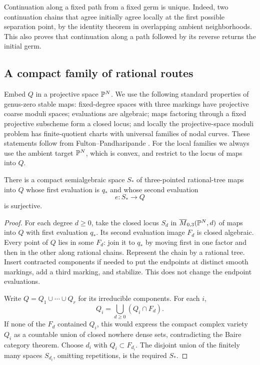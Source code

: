 Continuation along a fixed path from a fixed germ is unique. Indeed,
two continuation chains that agree initially agree locally at the first
possible separation point, by the identity theorem in overlapping
ambient neighborhoods. This also proves that continuation along a path
followed by its reverse returns the initial germ.

\subsection{A compact family of rational routes}

Embed \(Q\) in a projective space \(\mathbb P^N\). We use the following standard
properties of genus-zero stable maps: fixed-degree spaces with three
markings have projective coarse moduli spaces; evaluations are algebraic;
maps factoring through a fixed projective subscheme form a closed locus;
and locally the projective-space moduli problem has finite-quotient charts
with universal families of nodal curves. These statements follow from
Fulton--Pandharipande \cite[Theorem~1, Proposition~3, and Sections~1.3, 4.1, 4.4, and 5.1]{FP97}.
For the local families we always use the ambient target \(\mathbb P^N\), which
is convex, and restrict to the locus of maps into \(Q\).

\begin{lemma}\label{cross:parameter-space}
There is a compact semialgebraic space \(S_*\) of three-pointed
rational-tree maps into \(Q\) whose first evaluation is \(q_*\) and
whose second evaluation
\[
 e:S_*\longrightarrow Q
\]
is surjective.
\end{lemma}
\begin{proof}
For each degree \(d\ge0\), take the closed locus \(S_d\) in
\(\overline M_{0,3}(\mathbb P^N,d)\) of maps into \(Q\) with first evaluation
\(q_*\). Its second evaluation image \(F_d\) is closed algebraic.
Every point of \(Q\) lies in some \(F_d\): join it to \(q_*\) by moving
first in one factor and then in the other along rational chains.
Represent the chain by a rational tree. Insert contracted components if
needed to put the endpoints at distinct smooth markings, add a third
marking, and stabilize. This does not change the endpoint evaluations.

Write \(Q=Q_1\cup\cdots\cup Q_r\) for its irreducible components.
For each \(i\),
\[
 Q_i=\bigcup_{d\ge0}(Q_i\cap F_d).
\]
If none of the \(F_d\) contained \(Q_i\), this would express the compact
complex variety \(Q_i\) as a countable union of closed nowhere dense
sets, contradicting the Baire category theorem. Choose \(d_i\) with
\(Q_i\subset F_{d_i}\). The disjoint union of the finitely many spaces
\(S_{d_i}\), omitting repetitions, is the required \(S_*\).
\end{proof}

